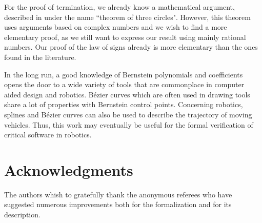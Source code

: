 \documentclass{mscs}
\begin{document}
For the proof of termination, we already know a mathematical argument,
described in \cite{bpr} under the name ``theorem of three
circles". However, this theorem uses arguments based on complex
numbers and we wish to find a more elementary proof, as we still want
to express our result using mainly rational numbers.  Our proof of the
law of signs already is more elementary than the ones found in
the literature.

In the long run, a good knowledge of Bernstein polynomials and
coefficients opens the door to a wide variety of tools that are
commonplace in computer aided design and robotics. B\'ezier curves
which are often used in drawing tools share a lot of properties with
Bernstein control points. Concerning robotics, splines and B\'ezier
curves can also be used to describe the trajectory of moving
vehicles.  Thus, this work may eventually be useful for the formal
verification of critical software in robotics.

\section{Acknowledgments} The authors whish to gratefully thank the
anonymous referees who have suggested numerous improvements both for
the formalization and for its description.



\end{document}
